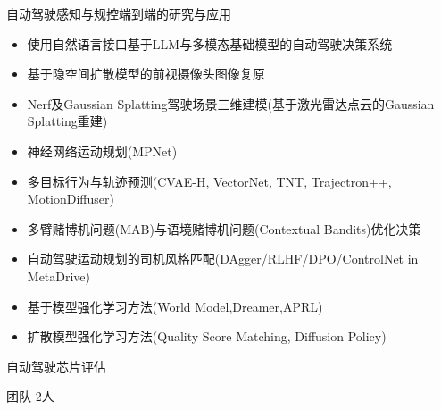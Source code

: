 \documentclass[../cv_cn.tex]{subfiles}
\begin{document}
\begin{cventries}
{\begin{cvitems}
			\item 自动驾驶感知与规控端到端的研究与应用
			\begin{itemize}
				\item 使用自然语言接口基于LLM与多模态基础模型的自动驾驶决策系统 \supercite{Xin_LLM_24} \supercite{Xin_VLM_24}
				\item 基于隐空间扩散模型的前视摄像头图像复原\supercite{Xin_Latent_Diffusion_23}
				\item Nerf及Gaussian Splatting驾驶场景三维建模(基于激光雷达点云的Gaussian Splatting重建)
				\item 神经网络运动规划(MPNet)
				\item 多目标行为与轨迹预测(CVAE-H, VectorNet, TNT, Trajectron++, MotionDiffuser)
				\item 多臂赌博机问题(MAB)与语境赌博机问题(Contextual Bandits)优化决策
				\item 自动驾驶运动规划的司机风格匹配(DAgger/RLHF/DPO/ControlNet in MetaDrive)
				\item 基于模型强化学习方法(World Model,Dreamer,APRL)
				\item 扩散模型强化学习方法(Quality Score Matching, Diffusion Policy)
			\end{itemize}
			\item 自动驾驶芯片评估
			\item 团队 2人
		\end{cvitems}
	}


\end{cventries}
\end{document}
